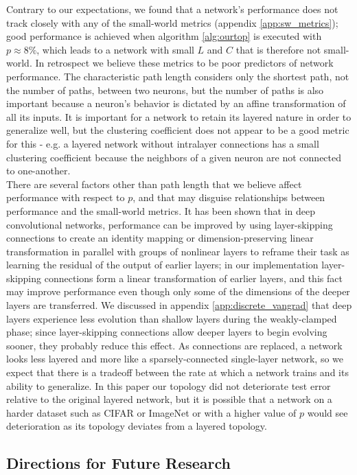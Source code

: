 \documentclass[format=sigconf]{acmart}
\newcommand{\npar}{\\\indent}
\begin{document}
Contrary to our expectations, we found that a network's performance does not track closely with any of the small-world metrics (appendix \ref{app:sw_metrics}); good performance is achieved when algorithm \ref{alg:ourtop} is executed with $p\approx 8\%$, which leads to a network with small $L$ and $C$ that is therefore not small-world. In retrospect we believe these metrics to be poor predictors of network performance. The characteristic path length considers only the shortest path, not the number of paths, between two neurons, but the number of paths is also important because a neuron's behavior is dictated by an affine transformation of all its inputs. It is important for a network to retain its layered nature in order to generalize well, but the clustering coefficient does not appear to be a good metric for this - e.g. a layered network without intralayer connections has a small clustering coefficient because the neighbors of a given neuron are not connected to one-another.
\npar
There are several factors other than path length that we believe affect performance with respect to $p$, and that may disguise relationships between performance and the small-world metrics. It has been shown \cite{he2015, ioffe2015} that in deep convolutional networks, performance can be improved by using layer-skipping connections to create an identity mapping or dimension-preserving linear transformation in parallel with groups of nonlinear layers to reframe their task as learning the residual of the output of earlier layers; in our implementation layer-skipping connections form a linear transformation of earlier layers, and this fact may improve performance even though only some of the dimensions of the deeper layers are transferred. We discussed in appendix \ref{app:discrete_vangrad} that deep layers experience less evolution than shallow layers during the weakly-clamped phase; since layer-skipping connections allow deeper layers to begin evolving sooner, they probably reduce this effect. As connections are replaced, a network looks less layered and more like a sparsely-connected single-layer network, so we expect that there is a tradeoff between the rate at which a network trains and its ability to generalize. In this paper our topology did not deteriorate test error relative to the original layered network, but it is possible that a network on a harder dataset such as CIFAR or ImageNet or with a higher value of $p$ would see deterioration as its topology deviates from a layered topology.



\subsection{Directions for Future Research}
\end{document}
